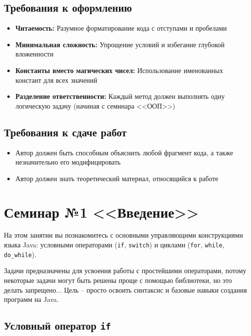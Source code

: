 \documentclass[12pt]{article}
\begin{document}
\subsection*{Требования к оформлению}
\begin{itemize}
\item \textbf{Читаемость:} Разумное форматирование кода с отступами и пробелами
    \item \textbf{Минимальная сложность:} Упрощение условий и избегание глубокой
     вложенности
    \item \textbf{Константы вместо магических чисел:} Использование именованных 
    констант для всех значений
    \item \textbf{Разделение ответственности:} Каждый метод должен выполнять 
    одну логическую задачу (начиная с семинара <<ООП>>)
\end{itemize}

\subsection*{Требования к сдаче работ}
\begin{itemize}
    \item Автор должен быть способным объяснить любой фрагмент кода, а также незначительно
    его модифицировать
    \item Автор должен знать теоретический материал, относящийся к работе
\end{itemize}

\section{Семинар №1 <<Введение>>}
На этом занятии вы познакомитесь с основными управляющими конструкциями языка Java: условными 
операторами (\texttt{if}, \texttt{switch}) и
 циклами (\texttt{for}, \texttt{while}, \texttt{do\_while}).

 Задачи предназначены для усвоения работы с простейшими операторами, потому
 некоторые задачи могут быть решены проще с помощью библиотеки, но это делать запрещено... 
 Цель -- просто освоить синтаксис и базовые навыки создания программ на Java.



\subsection{Условный оператор \texttt{if}}
\end{document}

